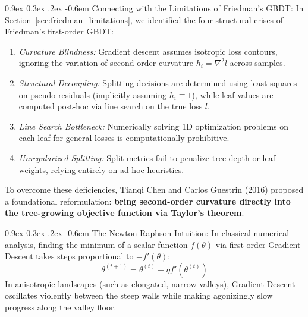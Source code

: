 \documentclass[11pt,a4paper]{article}
\makeatletter
\renewcommand\paragraph{\@startsection{paragraph}{4}{\z@}%
                                     {0.9ex \@plus0.3ex \@minus.2ex}%
                                     {-0.6em}%
                                     {\normalfont\normalsize\bfseries}}
\makeatother
\begin{document}
\paragraph{Connecting with the Limitations of Friedman's GBDT:}
In Section~\ref{sec:friedman_limitations}, we identified the four structural crises of Friedman's first-order GBDT:
\begin{enumerate}
    \item \emph{Curvature Blindness:} Gradient descent assumes isotropic loss contours, ignoring the variation of second-order curvature $h_i = \nabla^2 l$ across samples.
    \item \emph{Structural Decoupling:} Splitting decisions are determined using least squares on pseudo-residuals (implicitly assuming $h_i \equiv 1$), while leaf values are computed post-hoc via line search on the true loss $l$.
    \item \emph{Line Search Bottleneck:} Numerically solving 1D optimization problems on each leaf for general losses is computationally prohibitive.
    \item \emph{Unregularized Splitting:} Split metrics fail to penalize tree depth or leaf weights, relying entirely on ad-hoc heuristics.
\end{enumerate}

To overcome these deficiencies, Tianqi Chen and Carlos Guestrin (2016) proposed a foundational reformulation: \textbf{bring second-order curvature directly into the tree-growing objective function via Taylor's theorem}.

\paragraph{The Newton-Raphson Intuition:}
In classical numerical analysis, finding the minimum of a scalar function $f(\theta)$ via first-order Gradient Descent takes steps proportional to $-f'(\theta)$:
\begin{equation}
    \theta^{(t+1)} = \theta^{(t)} - \eta f'(\theta^{(t)})
\end{equation}
In anisotropic landscapes (such as elongated, narrow valleys), Gradient Descent oscillates violently between the steep walls while making agonizingly slow progress along the valley floor.
\end{document}
